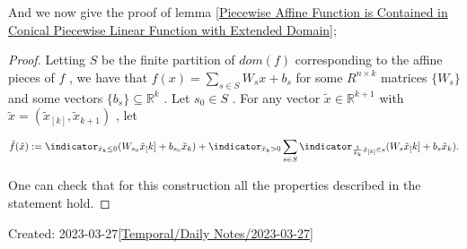 \documentclass{article}
\begin{document}
And we now give the proof of lemma \autoref{Piecewise Affine Function is Contained in Conical Piecewise Linear Function with Extended Domain};

\begin{proof}
    Letting  $S$  be the finite partition of  $dom(f)$  corresponding to the affine pieces of  $f$ , we have that  $f(x) = \sum_{s \in S} W_s x + b_s$  for some  $R^{n \times k}$  matrices  $\{ W_s \}$  and some vectors  $\{ b_s \}\subseteq \mathbb{R}^k$ . Let  $s_0 \in S$ . For any vector  $\tilde{x} \in \mathbb{R}^{k+1}$  with  $\tilde{x} = (\tilde{x}_{[k]}, \tilde{x}_{k+1})$ , let


    \begin{equation*}
        \tilde{f}(\tilde{x}) := \indicator_{\tilde{x}_k \leq 0} (W_{s_0} \tilde{x}_[k]+ b_{s_0}\tilde{x}_k) + \indicator_{\tilde{x}_k > 0} \sum_{s \in S} \indicator_{\frac{1}{\tilde{x}_k}\tilde{x}_{[k]} \in s} (W_s \tilde{x}_[k] + b_s \tilde{x}_k).
    \end{equation*}

    One can check that for this construction all the properties described in the statement hold.


\end{proof}

Created: 2023-03-27\ref{Temporal/Daily Notes/2023-03-27}

\printbibliography
\end{document}

